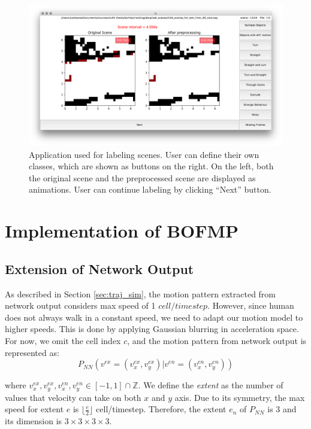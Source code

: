  \begin{figure}[H]
\centering
\includegraphics[width=.9\textwidth]{figures/application_1.png}
\caption[Application used for labeling scenes.]{Application used for labeling scenes. User can define their own classes, which are shown as buttons on the right. On the left, both the original scene and the preprocessed scene are displayed as animations. User can continue labeling by clicking ``Next'' button.} 
\label{fig:application}
\end{figure}

\section{Implementation of BOFMP} \label{sec:BOFMP_implementation}

\subsection{Extension of Network Output} \label{sec:mm_ext}

As described in Section \ref{sec:traj_sim}, the motion pattern extracted from network output considers max speed of 1 $cell/timestep$. However, since human does not always walk in a constant speed, we need to adapt our motion model to higher speeds. This is done by applying Gaussian blurring in acceleration space. For now, we omit the cell index $c$, and the motion pattern from network output is represented as:
\begin{equation}
P_{NN}(v^{ex}=(v^{ex}_x, v^{ex}_y)|v^{en}=(v^{en}_x, v^{en}_y)) \label{eq:mm_1}
\end{equation}

where $v^{ex}_x, v^{ex}_y,v^{en}_x, v^{en}_y \in [-1, 1] \cap \mathbb{Z}$. We define the \textit{extent} as the number of values that velocity can take on both $x$ and $y$ axis. Due to its symmetry, the max speed for extent $e$ is $\lfloor \frac{e}{2} \rfloor$ cell/timestep. Therefore, the extent $e_{n}$ of $P_{NN}$ is 3 and its dimension is $3 \times 3 \times 3 \times 3$. 

